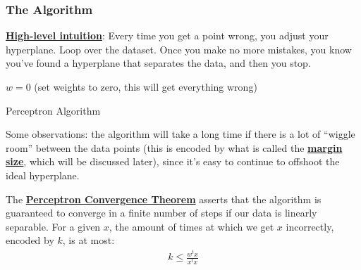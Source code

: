 \documentclass[11pt]{scrartcl}
\theoremstyle{definition}
\theoremstyle{remark}
\newcommand{\dfn}[1]{\textbf{\underline{#1}}}
\begin{document}
\subsubsection{The Algorithm}
\dfn{High-level intuition}: Every time you get a point wrong, you adjust your hyperplane. Loop over the dataset. Once you make no more mistakes, you know you've found a hyperplane that separates the data, and then you stop. 

\begin{algorithm}[H]
\SetAlgoLined
{}
 $w=0$ (set weights to zero, this will get everything wrong)\;
 \caption{Perceptron Algorithm}
\end{algorithm}

Some observations: the algorithm will take a long time if there is a lot of ``wiggle room'' between the data points (this is encoded by what is called the  \dfn{margin size}, which will be discussed later), since it's easy to continue to offshoot the ideal hyperplane. 

The \dfn{Perceptron Convergence Theorem} asserts that the algorithm is guaranteed to converge in a finite number of steps if our data is linearly separable. For a given $x$, the amount of times at which we get $x$ incorrectly, encoded by $k$, is at most: 
\begin{align}
	k \leq \frac{w^tx}{x^t x}
\end{align}
\end{document}
